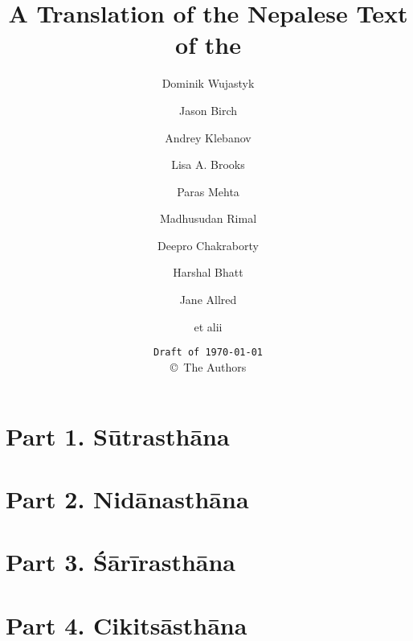 \documentclass[12pt,
    ]{book}
\title{A Translation of the Nepalese Text of the \SS}
\author{Dominik Wujastyk 
    \and Jason Birch
    \and Andrey Klebanov
    \and Lisa A. Brooks 
    \and Paras Mehta 
    \and Madhusudan Rimal
    \and Deepro Chakraborty
    \and Harshal Bhatt
    \and Jane Allred
    \and et alii}
\date{\texttt{Draft of \today}\\ \copyright\ The Authors}
\begin{document}
    
    
        
    \pagecolor{cyan}
    \thispagestyle{empty}
          \maketitle

        \newpage
        \pagecolor{white}
        \tableofcontents
        
        
            \thispagestyle{empty}
        
        \part{Part 1. Sūtrasthāna} 
                        
        
            \thispagestyle{empty}
        
            \thispagestyle{empty}
        
            \thispagestyle{empty}
            \thispagestyle{empty}
            \thispagestyle{empty}
            \thispagestyle{empty}
       
            \thispagestyle{empty}
        
            \thispagestyle{empty}       
        
            \thispagestyle{empty}
        
        \part{Part 2. Nidānasthāna}
        
        
            \thispagestyle{empty}
        
        \part{Part 3. Śārīrasthāna}
        
            \thispagestyle{empty}
        
        \part{Part 4. Cikitsāsthāna}
        
\end{document}
